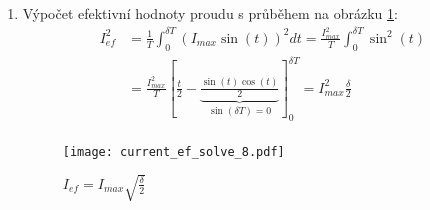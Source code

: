 {\begin{enumerate}
      \item Výpočet efektivní hodnoty proudu s průběhem na obrázku \ref{es:fig_current_ef_solve_8}:
        {\footnotesize
          \begin{align*}
            I_{ef}^2 
              &=  \frac{1}{T}\int_0^{\delta T}{\left(I_{max}\sin(t)\right)^2}dt=
                  \frac{I_{max}^2}{T}\int_0^{\delta T}{\sin^2(t)}                          \\ 
              &=  \frac{I_{max}^2}{T}\left[\frac{t}{2}-
                  \underbrace{\frac{\sin(t)\cos(t)}{2}}_{\sin(\delta T)=0}\right]_0^{\delta T}
                  = I_{max}^2\frac{\delta}{2}                                              \\
          \end{align*}
         } %
        \begin{figure}[ht!]
          \centering
          \texttt{[image: current\_ef\_solve\_8.pdf]}
          \caption{\(I_{ef} = I_{max}\sqrt{\frac{\delta}{2}} \)}
          \label{es:fig_current_ef_solve_8}
        \end{figure}

    \end{enumerate}

} %
\printbibliography[title={Seznam literatury}, heading=subbibliography]

